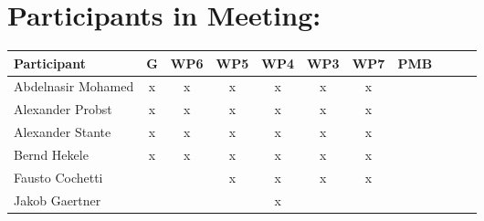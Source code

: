 \documentclass[a4paper, 11pt]{article}
\begin{document}
\section{Participants in Meeting:}

\begin{tabular}{|l|c|c|c|c||c|c|c||c|c|c|}
\hline
\textbf{Participant}  & \textbf{G} & \textbf{WP6} &  \textbf{WP5} & \textbf{WP4}&  \textbf{WP3} & \textbf{WP7}&  \textbf{PMB} \\\hline
Abdelnasir Mohamed    & x & x & x & x & x & x &   \\\hline 
Alexander Probst     & x & x & x & x & x & x &   \\\hline  
Alexander Stante     & x & x & x & x & x & x &   \\\hline 
Bernd Hekele         & x & x & x & x & x & x &   \\\hline
Fausto Cochetti      &  &   & x & x & x & x &   \\\hline
Jakob Gaertner       &  &   &   & x &   &   &   \\\hline

\end{tabular}
\end{document}
